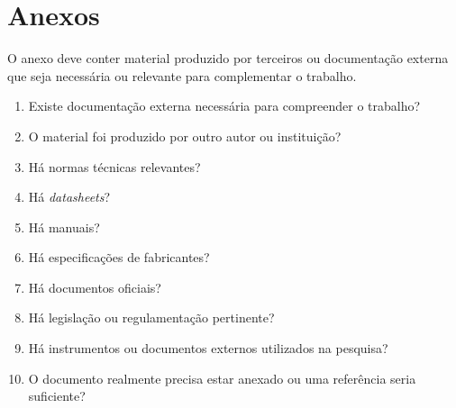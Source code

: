 \chapter{Anexos}

O anexo deve conter material produzido por terceiros ou documentação externa
que seja necessária ou relevante para complementar o trabalho.

\begin{enumerate}
	\item Existe documentação externa necessária para compreender o trabalho?
	\item O material foi produzido por outro autor ou instituição?
	\item Há normas técnicas relevantes?
	\item Há \textit{datasheets}?
	\item Há manuais?
	\item Há especificações de fabricantes?
	\item Há documentos oficiais?
	\item Há legislação ou regulamentação pertinente?
	\item Há instrumentos ou documentos externos utilizados na pesquisa?
	\item O documento realmente precisa estar anexado ou uma referência seria suficiente?
\end{enumerate}
